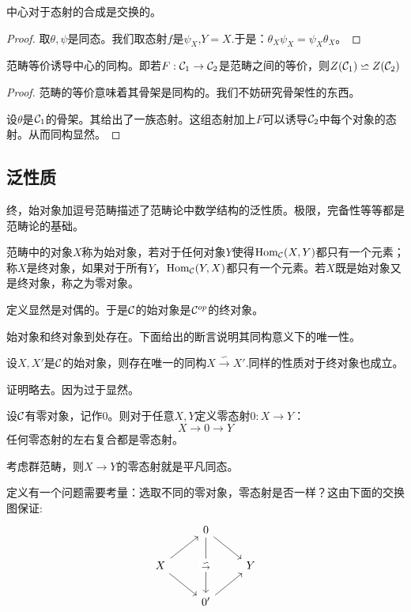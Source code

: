   \begin{proposition}{}
    中心对于态射的合成是交换的。
  \end{proposition}
  \begin{proof}
    取$\theta,\psi$是同态。我们取态射$f$是$\psi_X$,$Y=X$.于是：$\theta_X \psi_X=\psi_X \theta_X$。
  \end{proof}
  \begin{proposition}{}
    范畴等价诱导中心的同构。即若$F:\mathcal{C}_1 \to \mathcal{C}_2$是范畴之间的等价，则$Z(\mathcal{C}_1)\backsimeq Z(\mathcal{C}_2)$
  \end{proposition}
  \begin{proof}
    范畴的等价意味着其骨架是同构的。我们不妨研究骨架性的东西。

    设$\theta$是$\mathcal{C}_1$的骨架。其给出了一族态射。这组态射加上$F$可以诱导$\mathcal{C}_2$中每个对象的态射。从而同构显然。
  \end{proof}
  \subsection{泛性质}
  终，始对象加逗号范畴描述了范畴论中数学结构的泛性质。极限，完备性等等都是范畴论的基础。

  \begin{definition}{}
    范畴中的对象$X$称为始对象，若对于任何对象$Y$使得$\text{Hom}_{\mathcal{C}}(X,Y)$都只有一个元素；称$X$是终对象，如果对于所有$Y$，$\text{Hom}_{\mathcal{C}}(Y,X)$都只有一个元素。若$X$既是始对象又是终对象，称之为零对象。
  \end{definition}

  定义显然是对偶的。于是$\mathcal{C}$的始对象是$\mathcal{C}^{op}$的终对象。

   始对象和终对象到处存在。下面给出的断言说明其同构意义下的唯一性。
   \begin{proposition}{}
    设$X,X'$是$\mathcal{C}$的始对象，则存在唯一的同构$X\overset{\backsim}{\rightarrow}X'$.同样的性质对于终对象也成立。
   \end{proposition}
   
   证明略去。因为过于显然。

   \begin{definition}{}
    设$\mathcal{C}$有零对象，记作$0$。则对于任意$X,Y$定义零态射$0:X \to Y$：
    $$
    X \to 0 \to Y
    $$
    任何零态射的左右复合都是零态射。
   \end{definition}
   考虑群范畴，则$X \to Y$的零态射就是平凡同态。

   定义有一个问题需要考量：选取不同的零对象，零态射是否一样？这由下面的交换图保证:
   \[
    \centering
    \begin{tikzcd}
        & 0 \\
        X && Y \\
        & 0'
        \arrow[from=2-1, to=1-2]
        \arrow[from=1-2, to=2-3]
        \arrow[from=2-1, to=3-2]
        \arrow[from=3-2, to=2-3]
        \arrow["{\overset{\backsim}{\rightarrow}}"{description}, from=1-2, to=3-2]
    \end{tikzcd}
   \]

